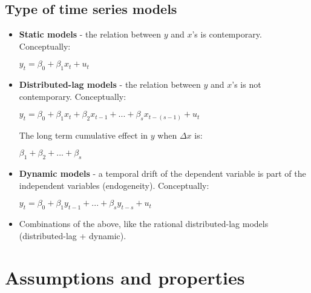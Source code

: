 \documentclass[10pt, a4paper, landscape]{extarticle}
\begin{document}
\begin{multicols}{3}
	\subsection*{Type of time series models}
		\begin{itemize}[leftmargin=*]
			\item \textbf{Static models} - the relation between $y$ and $x$'s is contemporary. Conceptually:
			\begin{center}
				$y_t = \beta_0 + \beta_1 x_t + u_t$
			\end{center}
			\item \textbf{Distributed-lag models} - the relation between $y$ and $x$'s is not contemporary. Conceptually:
			\begin{center}
				$y_t = \beta_0 + \beta_1 x_t + \beta_2 x_{t-1} + ... + \beta_{s} x_{t-(s-1)} + u_t$
			\end{center}
			The long term cumulative effect in $y$ when $\Delta x$ is:
			\begin{center}
			 	$\beta_1 + \beta_2 + ... + \beta_{s}$
			\end{center}
		 	\item \textbf{Dynamic models} - a temporal drift of the dependent variable is part of the independent variables (endogeneity). Conceptually:
		 	\begin{center}
		 		$y_t = \beta_0 + \beta_1 y_{t-1} + ... + \beta_s y_{t-s} + u_t$
		 	\end{center}
	 		\item Combinations of the above, like the rational distributed-lag models (distributed-lag + dynamic).
		\end{itemize}
\columnbreak
\section*{Assumptions and properties}

\end{multicols}
\end{document}
